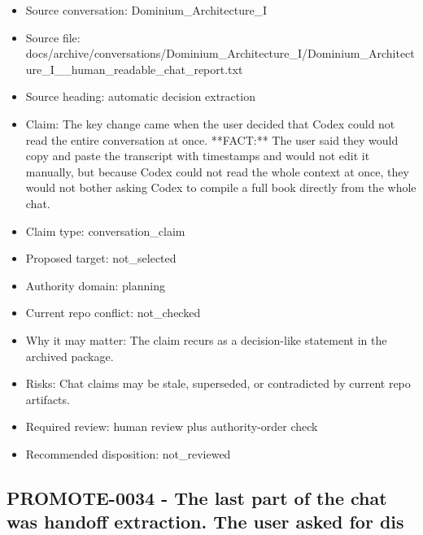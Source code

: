 \documentclass[11pt,a4paper]{report}
\begin{document}
\begin{itemize}
\item Source conversation: Dominium\_Architecture\_I
\item Source file: docs/archive/conversations/Dominium\_Architecture\_I/Dominium\_Architecture\_I\_\_human\_readable\_chat\_report.txt
\item Source heading: automatic decision extraction
\item Claim: The key change came when the user decided that Codex could not read the entire conversation at once. **FACT:** The user said they would copy and paste the transcript with timestamps and would not edit it manually, but because Codex could not read the whole context at once, they would not bother asking Codex to compile a full book directly from the whole chat.
\item Claim type: conversation\_claim
\item Proposed target: not\_selected
\item Authority domain: planning
\item Current repo conflict: not\_checked
\item Why it may matter: The claim recurs as a decision-like statement in the archived package.
\item Risks: Chat claims may be stale, superseded, or contradicted by current repo artifacts.
\item Required review: human review plus authority-order check
\item Recommended disposition: not\_reviewed
\end{itemize}

\subsection{PROMOTE-0034 - The last part of the chat was handoff extraction. The user asked for dis}
\end{document}
